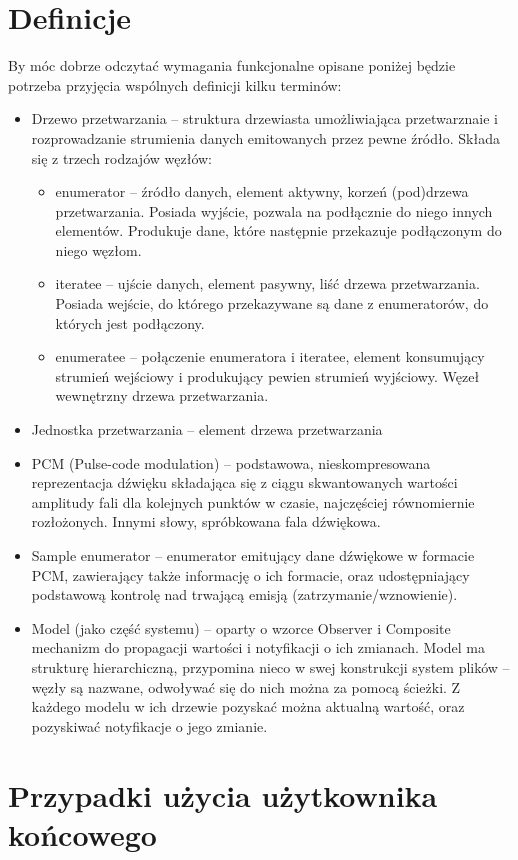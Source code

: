 \chapter{Definicje}
By móc dobrze odczytać wymagania funkcjonalne opisane poniżej będzie potrzeba przyjęcia wspólnych definicji kilku terminów:
\begin{itemize}
\item Drzewo przetwarzania – struktura drzewiasta umożliwiająca przetwarznaie i rozprowadzanie strumienia danych emitowanych przez pewne źródło. Składa się z trzech rodzajów węzłów:
\begin{itemize}
\item enumerator – źródło danych, element aktywny, korzeń (pod)drzewa przetwarzania. Posiada wyjście, pozwala na podłącznie do niego innych elementów. Produkuje dane, które następnie przekazuje podłączonym do niego węzłom.
\item iteratee – ujście danych, element pasywny, liść drzewa przetwarzania. Posiada wejście, do którego przekazywane są dane z enumeratorów, do których jest podłączony.
\item enumeratee – połączenie enumeratora i iteratee, element konsumujący strumień wejściowy i produkujący pewien strumień wyjściowy. Węzeł wewnętrzny drzewa przetwarzania.
\end{itemize}
\item Jednostka przetwarzania – element drzewa przetwarzania
\item PCM (Pulse-code modulation) – podstawowa, nieskompresowana reprezentacja dźwięku składająca się z ciągu skwantowanych wartości amplitudy fali dla kolejnych punktów w czasie, najczęściej równomiernie rozłożonych. Innymi słowy, spróbkowana fala dźwiękowa.
\item Sample enumerator – enumerator emitujący dane dźwiękowe w formacie PCM, zawierający także informację o ich formacie, oraz udostępniający podstawową kontrolę nad trwającą emisją (zatrzymanie/wznowienie).
\item Model (jako część systemu) – oparty o wzorce Observer i Composite mechanizm do propagacji wartości i notyfikacji o ich zmianach. Model ma strukturę hierarchiczną, przypomina nieco w swej konstrukcji system plików – węzły są nazwane, odwoływać się do nich można za pomocą ścieżki. Z każdego modelu w ich drzewie pozyskać można aktualną wartość, oraz pozyskiwać notyfikacje o jego zmianie.
\end{itemize}

\chapter{Przypadki użycia użytkownika końcowego}
